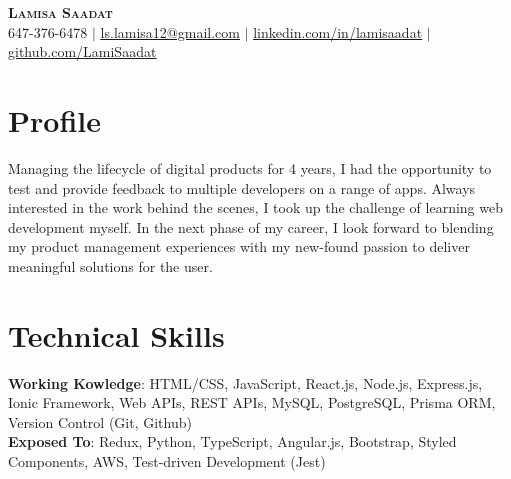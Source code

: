 \documentclass[letterpaper,11pt]{article}
\begin{document}

\begin{center}
    \textbf{\Huge \scshape Lamisa Saadat} \\ \vspace{1pt}
    \small 647-376-6478 $|$ \href{mailto:ls.lamisa12@gmail.com}{\underline{ls.lamisa12@gmail.com}} $|$ 
    \href{http://www.linkedin.com/in/lamisaadat}{\underline{linkedin.com/in/lamisaadat}} $|$
    \href{https://github.com/LamiSaadat}{\underline{github.com/LamiSaadat}}
\end{center}

\section{Profile}
 \begin{itemize}[leftmargin=0.15in, label={}]
    \small{\item{
     {Managing the lifecycle of digital products for 4 years, I had the opportunity to test and provide feedback to multiple developers on a range of apps. Always interested in the work behind the scenes, I took up the challenge of learning web development myself. In the next phase of my career, I look forward to blending my product management experiences with my new-found passion to deliver meaningful solutions for the user.} \\
    }}
 \end{itemize}

\section{Technical Skills}
 \begin{itemize}[leftmargin=0.15in, label={}]
    \small{\item{
     \textbf{Working Kowledge}{: HTML/CSS, JavaScript, React.js, Node.js, Express.js, Ionic Framework, Web APIs, REST APIs, MySQL, PostgreSQL, Prisma ORM, Version Control (Git, Github)} \\
     \textbf{Exposed To}{: Redux, Python, TypeScript, Angular.js, Bootstrap, Styled Components, AWS, Test-driven Development (Jest)} \\
    }}
 \end{itemize}
\end{document}
